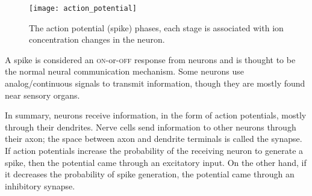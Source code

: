 \begin{figure}[hbt]
  \begin{center}
    \texttt{[image: action\_potential]}
    \caption{The action potential (spike) phases, each stage is associated with ion concentration changes in the neuron.}
    \label{fig:neuro:spike}
  \end{center}
\end{figure}

A spike is considered an \textsc{on}-or-\textsc{off} response from neurons and is thought to be the normal neural communication mechanism. Some neurons use analog/continuous signals to transmit information, though they are mostly found near sensory organs.

In summary, neurons receive information, in the form of action potentials, mostly through their dendrites. Nerve cells send information to other neurons through their axon; the space between axon and dendrite terminals is called the synapse. If action potentials increase the probability of the receiving neuron to generate a spike, then the potential came through an excitatory input. On the other hand, if it decreases the probability of spike generation, the potential came through an inhibitory synapse.

